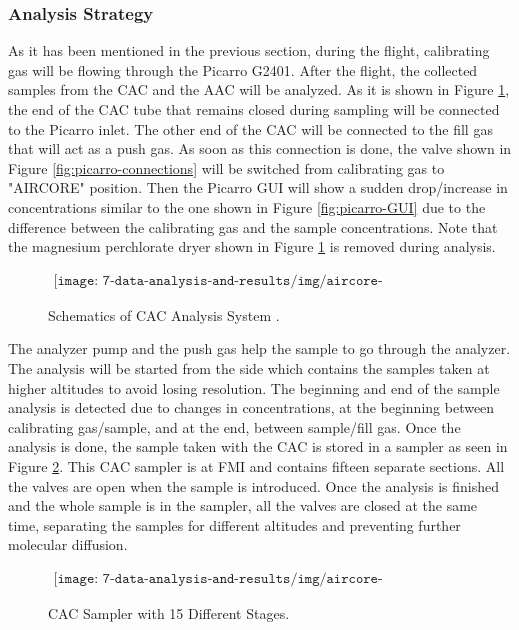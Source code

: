 \subsubsection{Analysis Strategy}

As it has been mentioned in the previous section, during the flight, calibrating gas will be flowing through the Picarro G2401. After the flight, the collected samples from the CAC and the AAC will be analyzed. As it is shown in Figure \ref{fig:aircore-analysis}, the end of the CAC tube that remains closed during sampling will be connected to the Picarro inlet. The other end of the CAC will be connected to the fill gas that will act as a push gas. As soon as this connection is done, the valve shown in Figure \ref{fig:picarro-connections} will be switched from calibrating gas to "AIRCORE" position. Then the Picarro GUI will show a sudden drop/increase in concentrations similar to the one shown in Figure \ref{fig:picarro-GUI} due to the difference between the calibrating gas and the sample concentrations. Note that the magnesium perchlorate dryer shown in Figure \ref{fig:aircore-analysis} is removed during analysis.  

\begin{figure}[H]
    \begin{align*}
        \texttt{[image: 7-data-analysis-and-results/img/aircore-analysis.png]}
    \end{align*}
    \caption{Schematics of CAC Analysis System \cite{AircoreFlights}. \label{fig:aircore-analysis}}
\end{figure}

The analyzer pump and the push gas help the sample to go through the analyzer. The analysis will be started from the side which contains the samples taken at higher altitudes to avoid losing resolution. The beginning and end of the sample analysis is detected due to changes in concentrations, at the beginning between calibrating gas/sample, and at the end, between sample/fill gas. Once the analysis is done, the sample taken with the CAC is stored in a sampler as seen in Figure \ref{fig:aircore-sampler}. This CAC sampler is at FMI and contains fifteen separate sections. All the valves are open when the sample is introduced. Once the analysis is finished and the whole sample is in the sampler, all the valves are closed at the same time, separating the samples for different altitudes and preventing further molecular diffusion.  


\begin{figure}[H]
    \begin{align*}
        \texttt{[image: 7-data-analysis-and-results/img/aircore-sampler.jpeg]}
    \end{align*}
    \caption{CAC Sampler with 15 Different Stages. \label{fig:aircore-sampler}}
\end{figure}


